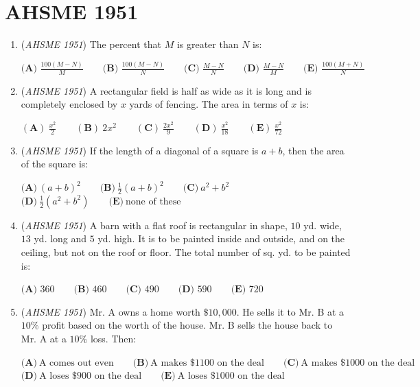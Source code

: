 \section{AHSME 1951}
        \begin{enumerate}
        	\item (\textit{AHSME 1951}) The percent that $M$ is greater than $N$ is:


 $\textbf{(A) \ } \frac {100(M - N)}{M} \qquad \textbf{(B) \ } \frac {100(M - N)}{N} \qquad \textbf{(C) \ } \frac {M - N}{N} \qquad \textbf{(D) \ } \frac {M - N}{M} \qquad \textbf{(E) \ } \frac {100(M + N)}{N}$


	\item (\textit{AHSME 1951}) A rectangular field is half as wide as it is long and is completely enclosed by $x$ yards of fencing. The area in terms of $x$ is:


 $(\textbf{A})\ \frac{x^2}2 \qquad (\textbf{B})\ 2x^2 \qquad (\textbf{C})\ \frac{2x^2}9 \qquad (\textbf{D})\ \frac{x^2}{18} \qquad (\textbf{E})\ \frac{x^2}{72}$


	\item (\textit{AHSME 1951}) If the length of a diagonal of a square is $a + b$, then the area of the square is:


 $\textbf{(A)}\ (a+b)^{2}\qquad\textbf{(B)}\ \frac{1}{2}(a+b)^{2}\qquad\textbf{(C)}\ a^{2}+b^{2}$
$\textbf{(D)}\ \frac{1}{2}(a^{2}+b^{2})\qquad\textbf{(E)}\ \text{none of these}$


	\item (\textit{AHSME 1951}) A barn with a flat roof is rectangular in shape, $10$ yd. wide, $13$ yd. long and $5$ yd. high.  It is to be painted inside and outside, and on the ceiling, but not on the roof or floor. The total number of sq. yd. to be painted is:


 $\textbf{(A) \ } 360 \qquad \textbf{(B) \ } 460 \qquad \textbf{(C) \ } 490 \qquad \textbf{(D) \ } 590 \qquad \textbf{(E) \ } 720$


	\item (\textit{AHSME 1951}) Mr. A owns a home worth $\$10,000$.  He sells it to Mr. B at a $10 \%$ profit based on the worth of the house. Mr. B sells the house back to Mr. A at a $10 \%$ loss.  Then:


 $\textbf{(A)}\ \text{A comes out even} \qquad\textbf{(B)}\ \text{A makes \$1100 on the deal} \qquad\textbf{(C)}\ \text{A makes \$1000 on the deal}$
$\textbf{(D)}\ \text{A loses \$900 on the deal} \qquad\textbf{(E)}\ \text{A loses \$1000 on the deal}$



\end{enumerate}

